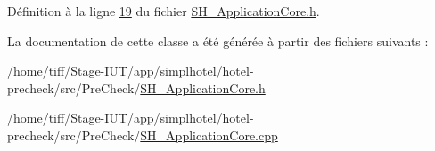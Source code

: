 Définition à la ligne \hyperlink{SH__ApplicationCore_8h_source_l00019}{19} du fichier \hyperlink{SH__ApplicationCore_8h_source}{S\-H\-\_\-\-Application\-Core.\-h}.



La documentation de cette classe a été générée à partir des fichiers suivants \-:\begin{DoxyCompactItemize}
\item 
/home/tiff/\-Stage-\/\-I\-U\-T/app/simplhotel/hotel-\/precheck/src/\-Pre\-Check/\hyperlink{SH__ApplicationCore_8h}{S\-H\-\_\-\-Application\-Core.\-h}\item 
/home/tiff/\-Stage-\/\-I\-U\-T/app/simplhotel/hotel-\/precheck/src/\-Pre\-Check/\hyperlink{SH__ApplicationCore_8cpp}{S\-H\-\_\-\-Application\-Core.\-cpp}\end{DoxyCompactItemize}
